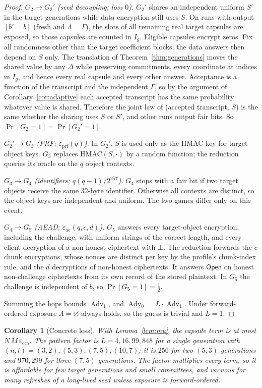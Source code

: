 \documentclass[pdflatex,sn-mathphys-num]{sn-jnl}
\theoremstyle{plain}
\newtheorem{corollary}[theorem]{Corollary}
\theoremstyle{definition}
\newcommand{\Adv}{\operatorname{Adv}}
\begin{document}
\begin{proof}
\emph{$G_2\to G_2'$ (seed decoupling; loss $0$).} $G_2'$ shares an independent uniform $S'$ in the target generations while data encryption still uses $S$. On runs with output $[b'=b]$ (fresh and $\Lambda=\Gamma$), the slots of all remaining real target capsules are exposed, so those capsules are counted in $I_g$. Eligible capsules encrypt zeros. Fix all randomness other than the target coefficient blocks; the data answers then depend on $S$ only. The translation of Theorem~\ref{thm:generations} moves the shared value by any $\Delta$ while preserving commitments, every coordinate at indices in $I_g$, and hence every real capsule and every other answer. Acceptance is a function of the transcript and the independent $\Gamma$, so by the argument of Corollary~\ref{cor:adaptive} each accepted transcript has the same probability whatever value is shared. Therefore the joint law of (accepted transcript, $S$) is the same whether the sharing uses $S$ or $S'$, and other runs output fair bits. So $\Pr[G_2=1]=\Pr[G_2'=1]$.

\emph{$G_2'\to G_3$ (PRF; $\varepsilon_{\mathrm{prf}}(q)$).} In $G_2'$, $S$ is used only as the HMAC key for target object keys. $G_3$ replaces HMAC$(S,\cdot)$ by a random function; the reduction queries its oracle on the $q$ object contexts.

\emph{$G_3\to G_4$ (identifiers; $q(q-1)/2^{257}$).} $G_4$ stops with a fair bit if two target objects receive the same 32-byte identifier. Otherwise all contexts are distinct, so the object keys are independent and uniform. The two games differ only on this event.

\emph{$G_4\to G_5$ (AEAD; $\varepsilon_{\mathrm{ae}}(q,c,d)$).} $G_5$ answers every target-object encryption, including the challenge, with uniform strings of the correct length, and every client decryption of a non-honest ciphertext with $\bot$. The reduction forwards the $c$ chunk encryptions, whose nonces are distinct per key by the profile's chunk-index rule, and the $d$ decryptions of non-honest ciphertexts. It answers $\mathsf{Open}$ on honest non-challenge ciphertexts from its own record of the stored plaintext. In $G_5$ the challenge is independent of $b$, so $\Pr[G_5=1]=\tfrac12$.

Summing the hops bounds $\Adv_1$, and $\Adv_0=L\cdot\Adv_1$. Under forward-ordered exposure $\Lambda=\varnothing$ always holds, so the guess is trivial and $L=1$.
\end{proof}

\begin{corollary}[Concrete loss]\label{cor:loss}
With Lemma~\ref{lem:mu}, the capsule term is at most $N\,M\,\varepsilon_{\mathrm{cca}}$. The pattern factor is $L=4,16,99,848$ for a single generation with $(n,t)=(3,2),(5,3),(7,5),(10,7)$; it is $256$ for two $(5,3)$ generations and $970{,}299$ for three $(7,5)$ generations. The factor multiplies every term, so it is affordable for few target generations and small committees, and vacuous for many refreshes of a long-lived seed unless exposure is forward-ordered.
\end{corollary}
\end{document}
